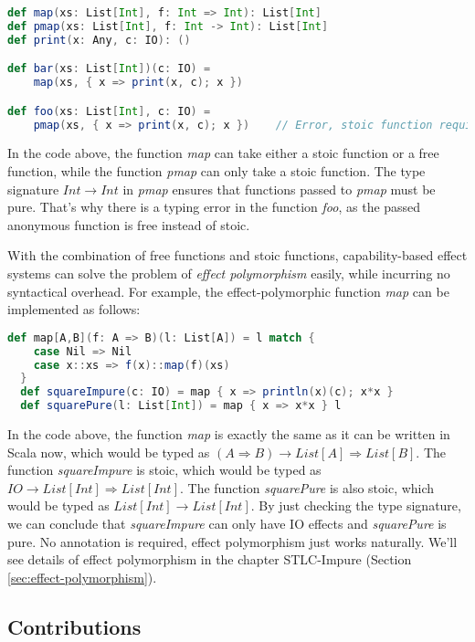 \begin{lstlisting}[language=Scala]
def map(xs: List[Int], f: Int => Int): List[Int]
def pmap(xs: List[Int], f: Int -> Int): List[Int]
def print(x: Any, c: IO): ()

def bar(xs: List[Int])(c: IO) =
    map(xs, { x => print(x, c); x })

def foo(xs: List[Int], c: IO) =
    pmap(xs, { x => print(x, c); x })    // Error, stoic function required
\end{lstlisting}

In the code above, the function \emph{map} can take either a stoic
function or a free function, while the function \emph{pmap} can only
take a stoic function. The type signature $Int \to Int$ in \emph{pmap}
ensures that functions passed to \emph{pmap} must be pure. That's why
there is a typing error in the function \emph{foo}, as the passed
anonymous function is free instead of stoic.

With the combination of free functions and stoic functions,
capability-based effect systems can solve the problem of \emph{effect
  polymorphism} easily, while incurring no syntactical overhead. For
example, the effect-polymorphic function \emph{map} can be implemented
as follows:

\begin{lstlisting}[language=Scala]
  def map[A,B](f: A => B)(l: List[A]) = l match {
    case Nil => Nil
    case x::xs => f(x)::map(f)(xs)
  }
  def squareImpure(c: IO) = map { x => println(x)(c); x*x }
  def squarePure(l: List[Int]) = map { x => x*x } l
\end{lstlisting}

In the code above, the function \emph{map} is exactly the same as it
can be written in Scala now, which would be typed as
$(A \Rightarrow B) \to List[A] \Rightarrow List[B]$. The function
\emph{squareImpure} is stoic, which would be typed as
$IO \to List[Int] \Rightarrow List[Int]$. The function
\emph{squarePure} is also stoic, which would be typed as
$List[Int] \to List[Int]$. By just checking the type signature, we can
conclude that \emph{squareImpure} can only have IO effects and
\emph{squarePure} is pure. No annotation is required, effect
polymorphism just works naturally. We'll see details of effect
polymorphism in the chapter STLC-Impure (Section
\ref{sec:effect-polymorphism}).

\subsection{Contributions}

